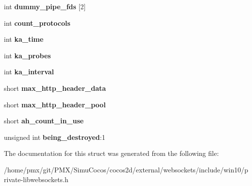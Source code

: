 \begin{DoxyCompactItemize}
$$int {\bfseries dummy\+\_\+pipe\+\_\+fds} \mbox{[}2\mbox{]}
\item 
\mbox{\label{structlws__context_a3729a0529e0a790ee41996114039a66f}} 
int {\bfseries count\+\_\+protocols}
\item 
\mbox{\label{structlws__context_a4daaaf2be15db4537885cc1f87a86b2b}} 
int {\bfseries ka\+\_\+time}
\item 
\mbox{\label{structlws__context_abb34676698e4293b629c3b3a1b9463d3}} 
int {\bfseries ka\+\_\+probes}
\item 
\mbox{\label{structlws__context_a9d117b4a68a45332559ecbf8b4964744}} 
int {\bfseries ka\+\_\+interval}
\item 
\mbox{\label{structlws__context_af01db13133f0fa2867e7f8922cb209ec}} 
short {\bfseries max\+\_\+http\+\_\+header\+\_\+data}
\item 
\mbox{\label{structlws__context_a9a591a8492de10c12b9507a8800b4107}} 
short {\bfseries max\+\_\+http\+\_\+header\+\_\+pool}
\item 
\mbox{\label{structlws__context_a6a8207114c8ac2ebc6f067d7422096b1}} 
short {\bfseries ah\+\_\+count\+\_\+in\+\_\+use}
\item 
\mbox{\label{structlws__context_aa258c867ffaddb42bb97050635af9283}} 
unsigned int {\bfseries being\+\_\+destroyed}\+:1
\end{DoxyCompactItemize}


The documentation for this struct was generated from the following file\+:\begin{DoxyCompactItemize}
\item 
/home/pmx/git/\+P\+M\+X/\+Simu\+Cocos/cocos2d/external/websockets/include/win10/private-\/libwebsockets.\+h\end{DoxyCompactItemize}
